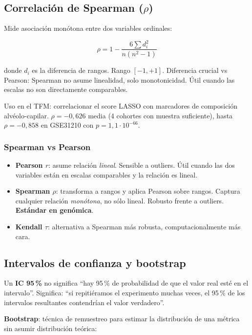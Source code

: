 \documentclass[11pt, a4paper]{article}
\begin{document}
\subsection{Correlaci\'on de Spearman ($\rho$)}

Mide asociaci\'on mon\'otona entre dos variables ordinales:

\[ \rho = 1 - \frac{6 \sum d_i^2}{n(n^2-1)} \]

donde $d_i$ es la diferencia de rangos. Rango $[-1, +1]$. Diferencia
crucial vs Pearson: Spearman no asume linealidad, solo monotonicidad.
\'Util cuando las escalas no son directamente comparables.

Uso en el TFM: correlacionar el score LASSO con marcadores de composici\'on
alv\'eolo-capilar. $\rho = -0{,}626$ media (4 cohortes con muestra
suficiente), hasta $\rho = -0{,}858$ en GSE31210 con $p = 1{,}1 \cdot 10^{-66}$.

\subsubsection*{Spearman vs Pearson}

\begin{itemize}[leftmargin=1.2em]
  \item \textbf{Pearson $r$}: asume relaci\'on \emph{lineal}. Sensible a
  outliers. \'Util cuando las dos variables est\'an en escalas
  comparables y la relaci\'on es lineal.
  \item \textbf{Spearman $\rho$}: transforma a rangos y aplica Pearson
  sobre rangos. Captura cualquier relaci\'on \emph{mon\'otona}, no s\'olo
  lineal. Robusto frente a outliers. \textbf{Est\'andar en gen\'omica}.
  \item \textbf{Kendall $\tau$}: alternativa a Spearman m\'as robusta,
  computacionalmente m\'as cara.
\end{itemize}

\subsection{Intervalos de confianza y bootstrap}

Un \textbf{IC 95\,\%} no significa ``hay 95\,\% de probabilidad de que el
valor real est\'e en el intervalo''. Significa: ``si repiti\'eramos el
experimento muchas veces, el 95\,\% de los intervalos resultantes
contendr\'ian el valor verdadero''.

\textbf{Bootstrap}: t\'ecnica de remuestreo para estimar la distribuci\'on
de una m\'etrica sin asumir distribuci\'on te\'orica:
\end{document}
